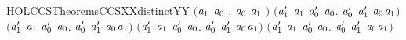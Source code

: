 \begin{SaveVerbatim}{HOLCCSTheoremsCCSXXdistinctYY}
   \ensuremath{(}\HOLSymConst{\HOLTokenForall{}}\ensuremath{\HOLBoundVar{a}\sb{\mathrm{1}}} \ensuremath{\HOLBoundVar{a}\sb{\mathrm{0}}} .  \ensuremath{\HOLBoundVar{a}\sb{\mathrm{0}}} \ensuremath{\HOLBoundVar{a}\sb{\mathrm{1}}} \HOLSymConst{\HOLTokenNotEqual{}}  \ensuremath{)} \HOLSymConst{\HOLTokenConj{}}
   \ensuremath{(}\HOLSymConst{\HOLTokenForall{}}\ensuremath{\HOLBoundVar{a}\sb{\mathrm{1}}\sp{\prime{}}} \ensuremath{\HOLBoundVar{a}\sb{\mathrm{1}}} \ensuremath{\HOLBoundVar{a}\sb{\mathrm{0}}\sp{\prime{}}} \ensuremath{\HOLBoundVar{a}\sb{\mathrm{0}}}. \ensuremath{\HOLBoundVar{a}\sb{\mathrm{0}}\sp{\prime{}}} \HOLSymConst{\ensuremath{+}} \ensuremath{\HOLBoundVar{a}\sb{\mathrm{1}}\sp{\prime{}}} \HOLSymConst{\HOLTokenNotEqual{}} \ensuremath{\HOLBoundVar{a}\sb{\mathrm{0}}}\HOLSymConst{\ensuremath{\ldotp}}\ensuremath{\HOLBoundVar{a}\sb{\mathrm{1}}}\ensuremath{)} \HOLSymConst{\HOLTokenConj{}}
   \ensuremath{(}\HOLSymConst{\HOLTokenForall{}}\ensuremath{\HOLBoundVar{a}\sb{\mathrm{1}}\sp{\prime{}}} \ensuremath{\HOLBoundVar{a}\sb{\mathrm{1}}} \ensuremath{\HOLBoundVar{a}\sb{\mathrm{0}}\sp{\prime{}}} \ensuremath{\HOLBoundVar{a}\sb{\mathrm{0}}}. \ensuremath{\HOLBoundVar{a}\sb{\mathrm{0}}\sp{\prime{}}} \HOLSymConst{\ensuremath{\mid}} \ensuremath{\HOLBoundVar{a}\sb{\mathrm{1}}\sp{\prime{}}} \HOLSymConst{\HOLTokenNotEqual{}} \ensuremath{\HOLBoundVar{a}\sb{\mathrm{0}}}\HOLSymConst{\ensuremath{\ldotp}}\ensuremath{\HOLBoundVar{a}\sb{\mathrm{1}}}\ensuremath{)} \HOLSymConst{\HOLTokenConj{}}
   \ensuremath{(}\HOLSymConst{\HOLTokenForall{}}\ensuremath{\HOLBoundVar{a}\sb{\mathrm{1}}\sp{\prime{}}} \ensuremath{\HOLBoundVar{a}\sb{\mathrm{1}}} \ensuremath{\HOLBoundVar{a}\sb{\mathrm{0}}\sp{\prime{}}} \ensuremath{\HOLBoundVar{a}\sb{\mathrm{0}}}.  \ensuremath{\HOLBoundVar{a}\sb{\mathrm{0}}\sp{\prime{}}} \ensuremath{\HOLBoundVar{a}\sb{\mathrm{1}}\sp{\prime{}}} \HOLSymConst{\HOLTokenNotEqual{}} \ensuremath{\HOLBoundVar{a}\sb{\mathrm{0}}}\HOLSymConst{\ensuremath{\ldotp}}\ensuremath{\HOLBoundVar{a}\sb{\mathrm{1}}}\ensuremath{)} \HOLSymConst{\HOLTokenConj{}}
   \ensuremath{(}\HOLSymConst{\HOLTokenForall{}}\ensuremath{\HOLBoundVar{a}\sb{\mathrm{1}}\sp{\prime{}}} \ensuremath{\HOLBoundVar{a}\sb{\mathrm{1}}} \ensuremath{\HOLBoundVar{a}\sb{\mathrm{0}}\sp{\prime{}}} \ensuremath{\HOLBoundVar{a}\sb{\mathrm{0}}}.  \ensuremath{\HOLBoundVar{a}\sb{\mathrm{0}}\sp{\prime{}}} \ensuremath{\HOLBoundVar{a}\sb{\mathrm{1}}\sp{\prime{}}} \HOLSymConst{\HOLTokenNotEqual{}} \ensuremath{\HOLBoundVar{a}\sb{\mathrm{0}}}\HOLSymConst{\ensuremath{\ldotp}}\ensuremath{\HOLBoundVar{a}\sb{\mathrm{1}}}\ensuremath{)} \HOLSymConst{\HOLTokenConj{}}

\end{SaveVerbatim}
